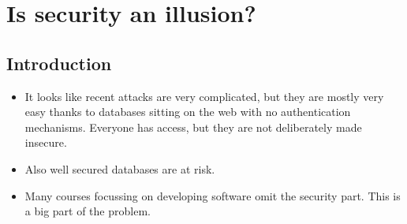 \documentclass[../main.tex]{subfiles}
\begin{document}
\chapter{Is security an illusion?}
\section{Introduction}
\begin{itemize}
\item It looks like recent attacks are very complicated, but they are mostly very easy thanks to databases sitting on the web with no authentication mechanisms. Everyone has access, but they are not deliberately made insecure. 
\item Also well secured databases are at risk.
\item Many courses focussing on developing software omit the security part. This is a big part of the problem.
\end{itemize}
\end{document}
